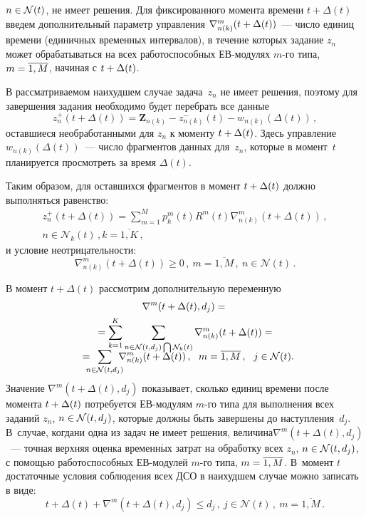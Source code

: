 \begin{multicols}{2}
\pagebreak

\noindent
 $n \hm\in \mathcal{N}(t)$,  не имеет решения. Для фиксированного момента времени 
$t + \Delta(t)$  введем дополнительный параметр управления
$\nabla _{n(k)}^m (t \hm+  \Delta(t))$~---  число единиц времени (единичных временных интервалов), 
в течение которых задание     $z_n$       может обрабатываться на всех работоспособных ЕВ-мо\-ду\-лях      
$m$-го типа,    $m \hm= \overline{1, M}$, начиная с  $t \hm+ \Delta(t)$.

В рассматриваемом наихудшем случае задача~$z_n$  не имеет решения, поэтому для завершения 
задания  необходимо будет перебрать все  данные
\begin{equation}
z^+_n(t + \Delta(t)) = \mathbf{Z}_{n(k)} - z_{n(k)}^-(t) - w_{n(k)}(\Delta(t))\,,
\label{e10-mal}
\end{equation}
 оставшиеся необработанными для  $z_n$ к моменту $t \hm+ \Delta(t)$.
Здесь управление  $w_{n(k)}(\Delta(t))$~--- число фрагментов данных для~$z_n$,  которые  
в момент~$t$ планируется просмотреть за время  $\Delta(t)$.

Таким образом, для оставшихся фрагментов  в момент $t \hm+ \Delta(t)$ должно выполняться равенство:
\begin{multline}
z^+_n(t + \Delta(t)) = \displaystyle\sum\limits_{m = 1}^M  p^m_k(t)  R^m(t)  \nabla _{n(k)}^m (t 
+ \Delta(t))\,,\\
 n \in \mathcal{N}_k(t)\,, k = \overline{1, K}\,,
 \label{e11-mal}
\end{multline}
и  условие неотрицательности:
$$
\nabla _{n(k)}^m (t + \Delta(t)) \ge 0\,,\ m = \overline{1, M}\,,\ n \in \mathcal{N}(t)\,.
$$

В момент $t + \Delta(t)$    рассмотрим дополнительную переменную
\begin{multline}
\nabla^m (t + \Delta(t), d_j) = {}\\
\vspace*{-3mm}{}=\sum\limits_{k = 1}^K  
\sum\limits_{n \in \mathcal{N}(t, d_j) \bigcap \mathcal{N}_k(t)} \nabla _{n(k)} ^m (t + \Delta(t)) = {}\\
{} = \!\!\!\!\sum\limits_{n \in \mathcal{N}(t, d_j)}\!\!\!\! \nabla _{n(k)}^m (t + \Delta(t))\,, \ \ m = \overline{1, M}\,, 
\ \  j \in \mathcal{N}(t).\!\!
\label{e12-mal}
\end{multline}
Значение $\nabla ^m (t + \Delta(t), d_j)$ показывает, сколько единиц времени после  
момента $t \hm+ \Delta(t)$  потребуется ЕВ-мо\-ду\-лям  $m$-го типа для выполнения всех 
заданий $z_n$, $n \hm\in \mathcal{N}(t, d_j)$, которые должны быть  завершены до наступления~$d_j$. 
В~случае, \mbox{когда}\linebreak ни одна из задач не имеет решения,  величина\linebreak   $\nabla ^m (t + \Delta(t), d_j)$~--- 
точная верхняя оценка временн$\acute{\mbox{ы}}$х затрат на обработку всех $z_n$, $n \hm\in \mathcal{N}(t, d_j)$, с помощью работоспособных  
ЕВ-мо\-ду\-лей $m$-го типа, $m \hm= \overline{1, M}$. 
В~момент  $t$ достаточные условия соблюдения всех ДСО в наихудшем случае можно записать в виде:
$$
 t + \Delta(t) + \nabla^{m}(t + \Delta(t), d_j) \le   d_j\,,  \   j \in \mathcal{N}(t)\,, \ m = \overline {1,M}\,.
 $$


\end{multicols}
